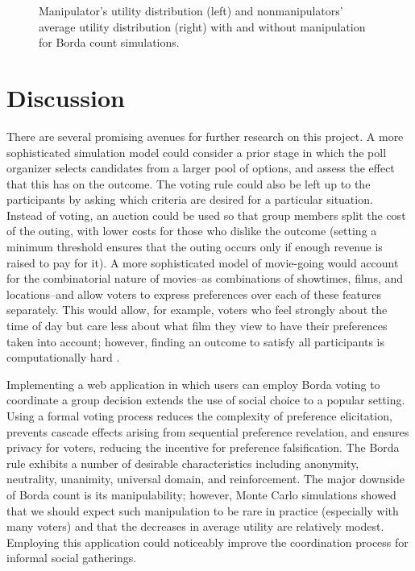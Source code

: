 \documentclass[12pt,letterpaper]{article} %
\begin{document}
\begin{center}
\begin{figure}[h!]
\begin{minipage}{0.45\textwidth}
\begin{center}
\end{center}
\end{minipage}
\caption{Manipulator's utility distribution (left) and nonmanipulators' average utility distribution (right) with and without manipulation for Borda count simulations.}
\label{nonmanip-manip-utils}
\end{figure}
\end{center}



\section{Discussion} 

There are several promising avenues for further research on this project. A more sophisticated simulation model could consider a prior stage in which the poll organizer selects candidates from a larger pool of options, and assess the effect that this has on the outcome. The voting rule could also be left up to the participants by asking which criteria are desired for a particular situation. Instead of voting, an auction could be used so that group members split the cost of the outing, with lower costs for those who dislike the outcome (setting a minimum threshold ensures that the outing occurs only if enough revenue is raised to pay for it). A more sophisticated model of movie-going would account for the combinatorial nature of movies--as combinations of showtimes, films, and locations--and allow voters to express preferences over each of these features separately. This would allow, for example, voters who feel strongly about the time of day but care less about what film they view to have their preferences taken into account; however, finding an outcome to satisfy all participants is computationally hard \citep{lu2011budgeted}. 

Implementing a web application in which users can employ Borda voting to coordinate a group decision extends the use of social choice to a popular setting. Using a formal voting process reduces the complexity of preference elicitation, prevents cascade effects arising from sequential preference revelation, and ensures privacy for voters, reducing the incentive for preference falsification. The Borda rule exhibits a number of desirable characteristics including anonymity, neutrality, unanimity, universal domain, and reinforcement. The major downside of Borda count is its manipulability; however, Monte Carlo simulations showed that we should expect such manipulation to be rare in practice (especially with many voters) and that the decreases in average utility are relatively modest. Employing this application could noticeably improve the coordination process for informal social gatherings. 
\end{document}
